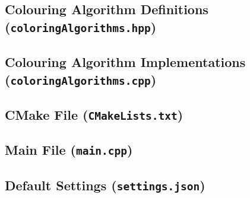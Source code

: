 \pagebreak

\subsection{Colouring Algorithm Definitions (\texttt{coloringAlgorithms.hpp})}


\subsection{Colouring Algorithm Implementations \\ (\texttt{coloringAlgorithms.cpp})}



\pagebreak

\subsection{CMake File (\texttt{CMakeLists.txt})}


\subsection{Main File (\texttt{main.cpp})}



\pagebreak

\subsection{Default Settings (\texttt{settings.json})}

